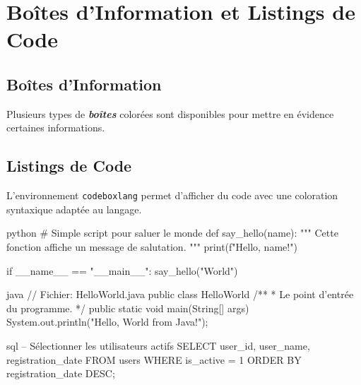 \documentclass{butexFR}
\begin{document}
\section{Boîtes d'Information et Listings de Code}

\subsection{Boîtes d'Information}
Plusieurs types de \textbf{\textit{boîtes}} colorées sont disponibles pour mettre en évidence certaines informations.





\subsection{Listings de Code}
L'environnement \texttt{codeboxlang} permet d'afficher du code avec une coloration syntaxique adaptée au langage.

\begin{codeboxlang}{python}
# Simple script pour saluer le monde
def say_hello(name):
"""
Cette fonction affiche un message de salutation.
"""
print(f"Hello, {name}!")

if __name__ == "__main__":
say_hello("World")
\end{codeboxlang}

\begin{codeboxlang}{java}
// Fichier: HelloWorld.java
public class HelloWorld {
/**
* Le point d'entrée du programme.
*/
	public static void main(String[] args) {
	System.out.println("Hello, World from Java!"); 
	}
}
\end{codeboxlang}

\begin{codeboxlang}{sql}
-- Sélectionner les utilisateurs actifs
SELECT
user_id,
user_name,
registration_date
FROM
users
WHERE
is_active = 1
ORDER BY
registration_date DESC;
\end{codeboxlang}
\end{document}
